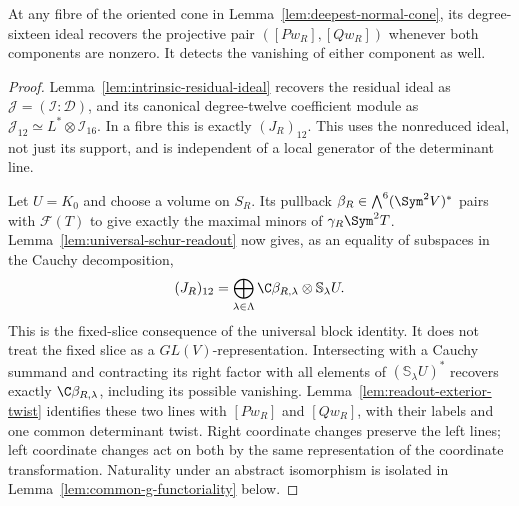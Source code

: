 \begin{lemma}
\label{lem:plucker-component-readout}
At any fibre of the oriented cone in
Lemma~\ref{lem:deepest-normal-cone}, its degree-sixteen ideal
recovers the projective pair \(([Pw_R],[Qw_R])\) whenever both
components are nonzero.  It detects the vanishing of either component
as well.
\end{lemma}
\begin{proof}
Lemma~\ref{lem:intrinsic-residual-ideal} recovers the residual
ideal as \(\mathcal J=(\mathcal I:\mathcal D)\), and its
canonical degree-twelve coefficient module as
\(\mathcal J_{12}\simeq L^*\otimes\mathcal I_{16}\).
In a fibre this is exactly \((J_R)_{12}\).  This uses the
nonreduced ideal, not just its support, and is independent of a
local generator of the determinant line.

Let \(U=K_0\) and choose a volume on \(S_R\).  Its pullback
\(\beta_R\in\bigwedge^6(\Sym^2V)^*\) pairs with
\(\mathcal F(T)\) to give exactly the maximal minors of
\(\gamma_R\Sym^2T\).  Lemma~\ref{lem:universal-schur-readout}
now gives, as an equality of subspaces in the Cauchy decomposition,
\begin{equation}\label{eq:minor-coefficient-readout}
 (J_R)_{12}=\bigoplus_{\lambda\in\Lambda}
       \C\beta_{R,\lambda}\otimes\mathbb S_\lambda U.
\end{equation}
This is the fixed-slice consequence of the universal block identity.
It does not treat the fixed slice as a \(GL(V)\)-representation.
Intersecting with a Cauchy summand and contracting its right factor
with all elements of \((\mathbb S_\lambda U)^*\) recovers exactly
\(\C\beta_{R,\lambda}\), including its possible vanishing.
Lemma~\ref{lem:readout-exterior-twist} identifies these two lines with
\([Pw_R]\) and \([Qw_R]\), with their labels and one common
determinant twist.  Right coordinate changes preserve the left lines;
left coordinate changes act on both by the same representation of the
coordinate transformation.  Naturality under an abstract isomorphism
is isolated in Lemma~\ref{lem:common-g-functoriality} below.
\end{proof}





